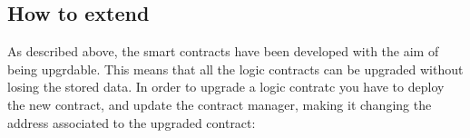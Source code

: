 \subsection{How to extend}
As described above, the smart contracts have been developed with the aim of being upgrdable. This means that all the logic contracts can be upgraded without losing the stored data. In order to upgrade a logic contratc you have to deploy the new contract, and update the contract manager, making it changing the address associated to the upgraded contract:

